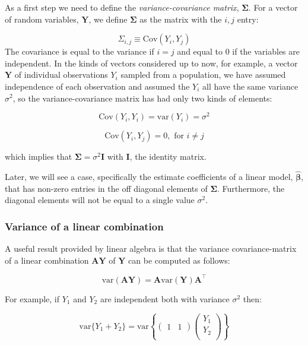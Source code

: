 \documentclass[
  letterpaper,
  DIV=11,
  numbers=noendperiod]{scrartcl}
\begin{document}
As a first step we need to define the \emph{variance-covariance matrix},
\(\boldsymbol{\Sigma}\). For a vector of random variables,
\(\mathbf{Y}\), we define \(\boldsymbol{\Sigma}\) as the matrix with the
\(i,j\) entry:

\[ \Sigma_{i,j} \equiv \mbox{Cov}(Y_i, Y_j) \] The covariance is equal
to the variance if \(i = j\) and equal to 0 if the variables are
independent. In the kinds of vectors considered up to now, for example,
a vector \(\mathbf{Y}\) of individual observations \(Y_i\) sampled from
a population, we have assumed independence of each observation and
assumed the \(Y_i\) all have the same variance \(\sigma^2\), so the
variance-covariance matrix has had only two kinds of elements:

\[ \mbox{Cov}(Y_i, Y_i) = \mbox{var}(Y_i) = \sigma^2\]

\[ \mbox{Cov}(Y_i, Y_j) = 0, \mbox{ for } i \neq j\]

which implies that \(\boldsymbol{\Sigma} = \sigma^2 \mathbf{I}\) with
\(\mathbf{I}\), the identity matrix.

Later, we will see a case, specifically the estimate coefficients of a
linear model, \(\hat{\boldsymbol{\beta}}\), that has non-zero entries in
the off diagonal elements of \(\boldsymbol{\Sigma}\). Furthermore, the
diagonal elements will not be equal to a single value \(\sigma^2\).

\subsubsection{Variance of a linear
combination}\label{variance-of-a-linear-combination}

A useful result provided by linear algebra is that the variance
covariance-matrix of a linear combination \(\mathbf{AY}\) of
\(\mathbf{Y}\) can be computed as follows:

\[
\mbox{var}(\mathbf{AY}) = \mathbf{A}\mbox{var}(\mathbf{Y}) \mathbf{A}^\top 
\]

For example, if \(Y_1\) and \(Y_2\) are independent both with variance
\(\sigma^2\) then:

\[\mbox{var}\{Y_1+Y_2\} = 
\mbox{var}\left\{ \begin{pmatrix}1&1\end{pmatrix}\begin{pmatrix} Y_1\\Y_2\\ \end{pmatrix}\right\}\]
\end{document}
